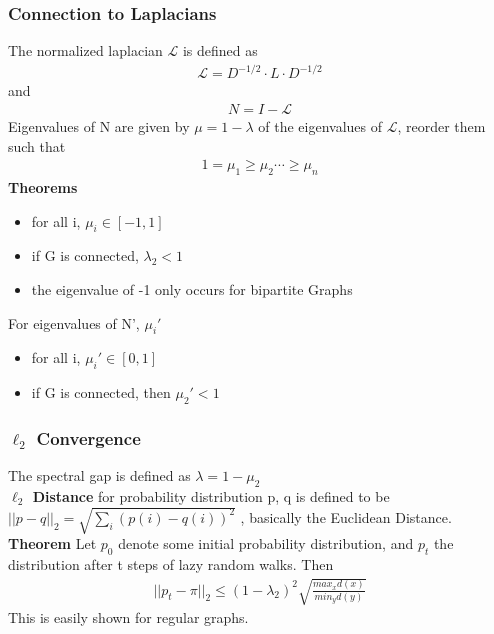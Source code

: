 \documentclass[12pt, letterpaper]{report}
\begin{document}
    \subsubsection{Connection to Laplacians}
    The normalized laplacian $\mathcal{L}$ is defined as
    \begin{gather*}
        \mathcal{L}=D^{-1/2}\cdot L \cdot D^{-1/2}
    \end{gather*}
    and
    \begin{gather*}
        N=I-\mathcal{L}
    \end{gather*}
    Eigenvalues of N are given by $\mu=1-\lambda$ of the eigenvalues of $\mathcal{L}$, reorder them such that\\
    \begin{gather*}
        1=\mu_{1}\geq\mu_{2}\cdots\geq\mu_{n}
    \end{gather*}
    \textbf{Theorems}\\
    \begin{itemize}
        \item for all i, $\mu_{i}\in[-1, 1]$
        \item if G is connected, $\lambda_{2}<1$
        \item the eigenvalue of -1 only occurs for bipartite Graphs
    \end{itemize}
    For eigenvalues of N', $\mu_i'$
    \begin{itemize}
        \item for all i, $\mu_{i}'\in[0,1]$
        \item if G is connected, then $\mu_2'<1$
    \end{itemize}
    \subsubsection{$\ell_2$ Convergence}
    The spectral gap is defined as $\lambda=1-\mu_2$\\
    \textbf{$\ell_2$ Distance} for probability distribution p, q is defined to be $||p-q||_{2}=\sqrt{\sum_{i}(p(i)-q(i))^{2}}$
    , basically the Euclidean Distance.
    \textbf{Theorem} Let $p_0$ denote some initial probability distribution, and $p_t$ the distribution after t steps
    of lazy random walks. Then
    \begin{gather*}
        ||p_t-\pi||_{2}\leq(1-\lambda_2)^{2}\sqrt{\frac{max_{x} d(x)}{min_y d(y)}}
    \end{gather*}
    This is easily shown for regular graphs.
\end{document}
